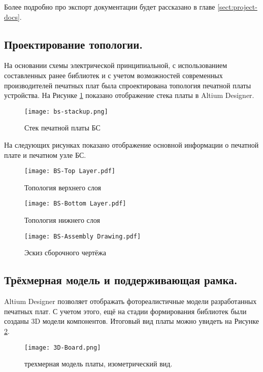 Более подробно про экспорт документации будет рассказано в главе \ref{sect:project-docs}.

\subsection{Проектирование топологии.} \label{sect:bs-topology}

На основании схемы электрической принципиальной, с использованием составленных ранее библиотек и с учетом возможностей современных производителей печатных плат была спроектирована топология печатной платы устройства. На Рисунке \ref{fig:bs-stackup} показано отображение стека платы в Altium Designer.

\begin{figure}[H]
	\centering
	\texttt{[image: bs-stackup.png]}
	\caption{Стек печатной платы БС}%
	\label{fig:bs-stackup}
\end{figure}

На следующих рисунках показано отображение основной информации о печатной плате и печатном узле БС.

\begin{figure}[H]
	\centering
	\texttt{[image: BS-Top Layer.pdf]}
	\caption{Топология верхнего слоя}%
\end{figure}

\begin{figure}[H]
\centering
\texttt{[image: BS-Bottom Layer.pdf]}
\caption{Топология нижнего слоя}%
\end{figure}


\begin{figure}[H]
	\centering
	\texttt{[image: BS-Assembly Drawing.pdf]}
	\caption{Эскиз сборочного чертёжа}%
\end{figure}

\subsection{Трёхмерная модель и поддерживающая рамка.}

Altium Designer позволяет отображать фотореалистичные модели разработанных печатных плат. С учетом этого, ещё на стадии формирования библиотек были созданы 3D модели компонентов. Итоговый вид платы можно увидеть на Рисунке \ref{fig:3D-Board}.

\begin{figure}[H]
	\centering
	\texttt{[image: 3D-Board.png]}
	\caption{трехмерная модель платы, изометрический вид.}%
	\label{fig:3D-Board}
\end{figure}

